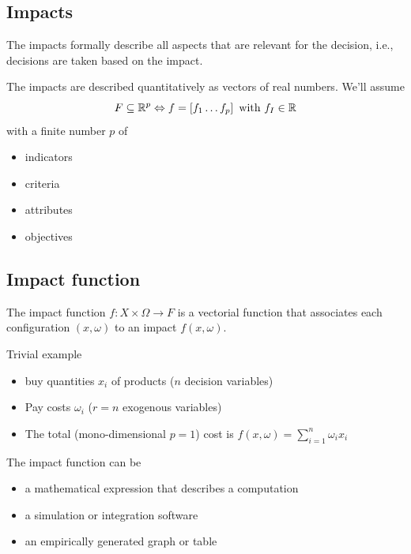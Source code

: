 \subsection{Impacts}
\label{subsec:impactsdef}

The impacts formally describe all aspects that are relevant for the decision, i.e., decisions are taken based on the impact. 

The impacts are described quantitatively as vectors of real numbers. We'll assume 
$$ F \subseteq \mathbb{R}^p \Leftrightarrow f = \left[f_1 \dots f_p\right] \text{ with } f_I \in \mathbb{R} $$
with a finite number $p$ of 
\begin{itemize}
	\item indicators
	
	\item criteria
	
	\item attributes
	
	\item objectives
\end{itemize}

\subsection{Impact function}
\label{subsec:impactfunctiondef}

The impact function $f: X \times \Omega \rightarrow F$ is a vectorial function that associates each configuration $(x, \omega)$ to an impact $f(x, \omega)$. 

Trivial example
\begin{itemize}
	\item buy quantities $x_i$ of products ($n$ decision variables)
	
	\item Pay costs $\omega_i$ ($r = n$ exogenous variables)
	
	\item The total (mono-dimensional $p=1$) cost is $f(x, \omega) = \sum_{i=1}^n \omega_i x_i$
\end{itemize}

The impact function can be
\begin{itemize}
	\item a mathematical expression that describes a computation 
	
	\item a simulation or integration software
	
	\item an empirically generated graph or table
\end{itemize}

